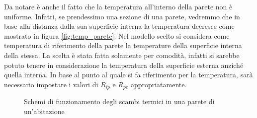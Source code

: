 \documentclass[laurea,oneside,11pt]{USiena_tesiLM}
\begin{document}
Da notare è anche il fatto che la temperatura all'interno della parete non è uniforme. Infatti, se prendessimo una sezione di una parete, vedremmo che in base alla distanza dalla sua superficie interna la temperatura decresce come mostrato in figura \ref{fig:temp_parete}.  Nel modello scelto si considera come temperatura di riferimento della parete la temperature della superficie interna della stessa. La scelta è stata fatta solamente per comodità, infatti si sarebbe potuto tenere in considerazione la temperatura della superficie esterna anziché quella interna. In base al punto al quale si fa riferimento per la temperatura, sarà necessario impostare  i valori di $R_{ip}$ e $R_{pe}$ appropriatamente.   

 \begin{figure}[h]
 \centering
 \hspace{5mm}
 \caption{Schemi di funzionamento degli scambi termici in una parete di un'abitazione}
 \end{figure}
\end{document}
